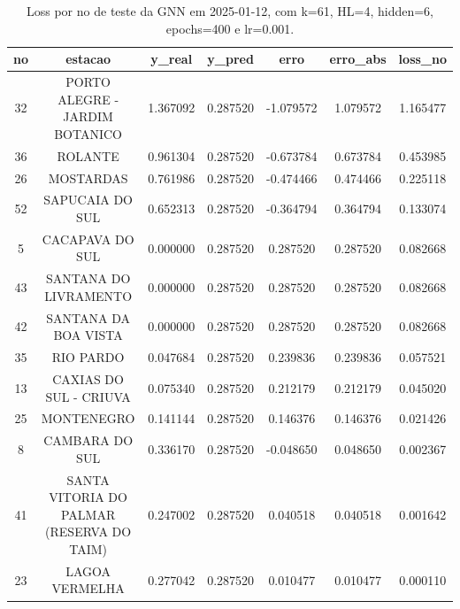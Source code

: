 \begin{table}[h]
\centering
\caption{Loss por no de teste da GNN em 2025-01-12, com k=61, HL=4, hidden=6, epochs=400 e lr=0.001.}
\label{tab:gnn_loss_k61_hl4_h6_e400_d20250112}
\begin{tabular}{ccccccc}
\toprule
no & estacao & y\_real & y\_pred & erro & erro\_abs & loss\_no \\
\midrule
32 & PORTO ALEGRE - JARDIM BOTANICO & 1.367092 & 0.287520 & -1.079572 & 1.079572 & 1.165477 \\
36 & ROLANTE & 0.961304 & 0.287520 & -0.673784 & 0.673784 & 0.453985 \\
26 & MOSTARDAS & 0.761986 & 0.287520 & -0.474466 & 0.474466 & 0.225118 \\
52 & SAPUCAIA DO SUL & 0.652313 & 0.287520 & -0.364794 & 0.364794 & 0.133074 \\
5 & CACAPAVA DO SUL & 0.000000 & 0.287520 & 0.287520 & 0.287520 & 0.082668 \\
43 & SANTANA DO LIVRAMENTO & 0.000000 & 0.287520 & 0.287520 & 0.287520 & 0.082668 \\
42 & SANTANA DA BOA VISTA & 0.000000 & 0.287520 & 0.287520 & 0.287520 & 0.082668 \\
35 & RIO PARDO & 0.047684 & 0.287520 & 0.239836 & 0.239836 & 0.057521 \\
13 & CAXIAS DO SUL - CRIUVA & 0.075340 & 0.287520 & 0.212179 & 0.212179 & 0.045020 \\
25 & MONTENEGRO & 0.141144 & 0.287520 & 0.146376 & 0.146376 & 0.021426 \\
8 & CAMBARA DO SUL & 0.336170 & 0.287520 & -0.048650 & 0.048650 & 0.002367 \\
41 & SANTA VITORIA DO PALMAR (RESERVA DO TAIM) & 0.247002 & 0.287520 & 0.040518 & 0.040518 & 0.001642 \\
23 & LAGOA VERMELHA & 0.277042 & 0.287520 & 0.010477 & 0.010477 & 0.000110 \\
\bottomrule
\end{tabular}
\end{table}
